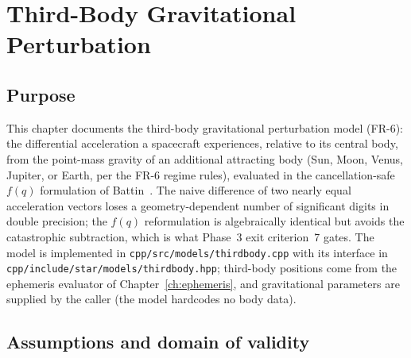 \chapter{Third-Body Gravitational Perturbation}
\label{ch:thirdbody}

\section{Purpose}
\label{sec:thirdbody:purpose}

This chapter documents the third-body gravitational perturbation model
(FR-6): the differential acceleration a spacecraft experiences, relative
to its central body, from the point-mass gravity of an additional
attracting body (Sun, Moon, Venus, Jupiter, or Earth, per the FR-6 regime
rules), evaluated in the cancellation-safe $f(q)$ formulation of
Battin~\cite{battin1999}. The naive difference of two nearly equal
acceleration vectors loses a geometry-dependent number of significant
digits in double precision; the $f(q)$ reformulation is algebraically
identical but avoids the catastrophic subtraction, which is what Phase~3
exit criterion~7 gates. The model is implemented in
\texttt{cpp/src/models/thirdbody.cpp} with its interface in
\texttt{cpp/include/star/models/thirdbody.hpp}; third-body positions come
from the ephemeris evaluator of Chapter~\ref{ch:ephemeris}, and
gravitational parameters are supplied by the caller (the model hardcodes
no body data).

\section{Assumptions and domain of validity}
\label{sec:thirdbody:domain}

